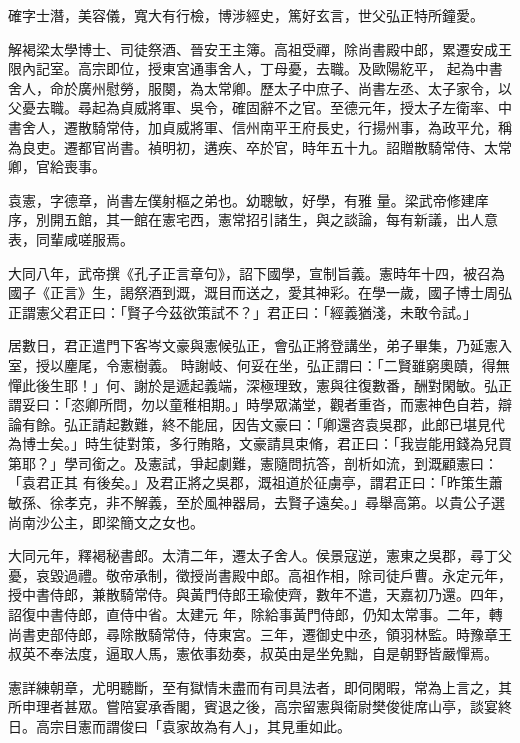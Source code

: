 \begin{pinyinscope}
 確字士潛，美容儀，寬大有行檢，博涉經史，篤好玄言，世父弘正特所鐘愛。



 解褐梁太學博士、司徒祭酒、晉安王主簿。高祖受禪，除尚書殿中郎，累遷安成王限內記室。高宗即位，授東宮通事舍人，丁母憂，去職。及歐陽紇平，
 起為中書舍人，命於廣州慰勞，服闋，為太常卿。歷太子中庶子、尚書左丞、太子家令，以父憂去職。尋起為貞威將軍、吳令，確固辭不之官。至德元年，授太子左衛率、中書舍人，遷散騎常侍，加貞威將軍、信州南平王府長史，行揚州事，為政平允，稱為良吏。遷都官尚書。禎明初，遘疾、卒於官，時年五十九。詔贈散騎常侍、太常卿，官給喪事。



 袁憲，字德章，尚書左僕射樞之弟也。幼聰敏，好學，有雅
 量。梁武帝修建庠序，別開五館，其一館在憲宅西，憲常招引諸生，與之談論，每有新議，出人意表，同輩咸嗟服焉。



 大同八年，武帝撰《孔子正言章句》，詔下國學，宣制旨義。憲時年十四，被召為國子《正言》生，謁祭酒到溉，溉目而送之，愛其神彩。在學一歲，國子博士周弘正謂憲父君正曰：「賢子今茲欲策試不？」君正曰：「經義猶淺，未敢令試。」



 居數日，君正遣門下客岑文豪與憲候弘正，會弘正將登講坐，弟子畢集，乃延憲入室，授以麈尾，令憲樹義。
 時謝岐、何妥在坐，弘正謂曰：「二賢雖窮奧賾，得無憚此後生耶！」何、謝於是遞起義端，深極理致，憲與往復數番，酬對閑敏。弘正謂妥曰：「恣卿所問，勿以童稚相期。」時學眾滿堂，觀者重沓，而憲神色自若，辯論有餘。弘正請起數難，終不能屈，因告文豪曰：「卿還咨袁吳郡，此郎已堪見代為博士矣。」時生徒對策，多行賄賂，文豪請具束脩，君正曰：「我豈能用錢為兒買第耶？」學司銜之。及憲試，爭起劇難，憲隨問抗答，剖析如流，到溉顧憲曰：「袁君正其
 有後矣。」及君正將之吳郡，溉祖道於征虜亭，謂君正曰：「昨策生蕭敏孫、徐孝克，非不解義，至於風神器局，去賢子遠矣。」尋舉高第。以貴公子選尚南沙公主，即梁簡文之女也。



 大同元年，釋褐秘書郎。太清二年，遷太子舍人。侯景寇逆，憲東之吳郡，尋丁父憂，哀毀過禮。敬帝承制，徵授尚書殿中郎。高祖作相，除司徒戶曹。永定元年，授中書侍郎，兼散騎常侍。與黃門侍郎王瑜使齊，數年不遣，天嘉初乃還。四年，詔復中書侍郎，直侍中省。太建元
 年，除給事黃門侍郎，仍知太常事。二年，轉尚書吏部侍郎，尋除散騎常侍，侍東宮。三年，遷御史中丞，領羽林監。時豫章王叔英不奉法度，逼取人馬，憲依事劾奏，叔英由是坐免黜，自是朝野皆嚴憚焉。



 憲詳練朝章，尤明聽斷，至有獄情未盡而有司具法者，即伺閑暇，常為上言之，其所申理者甚眾。嘗陪宴承香閣，賓退之後，高宗留憲與衛尉樊俊徙席山亭，談宴終日。高宗目憲而謂俊曰「袁家故為有人」，其見重如此。




\end{pinyinscope}
